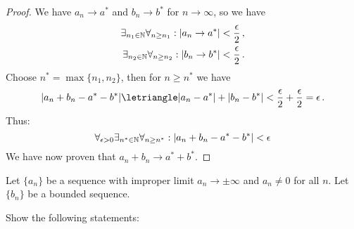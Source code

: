 \documentclass[week=3]{homework}
\begin{document}
\begin{questions}
\begin{parts}
\begin{proof}
	        	We have $a_n \to a^*$ and $b_n \to b^*$ for $n\to\infty$, so we have
		        \begin{align*}
		        	\exists_{n_1 \in\naturals}\forall_{n \geq n_1}: |a_n \to a^*| &< \frac{\epsilon}{2}\,, \\
		        	\exists_{n_2 \in\naturals}\forall_{n \geq n_2}: |b_n \to b^*| &< \frac{\epsilon}{2}\,.
	        	\end{align*}
	        	Choose $n^* = \max\{n_1,n_2\}$, then for $n \geq n^*$ we have
	        	\[
		        	|a_n + b_n - a^* - b^*| \letriangle |a_n - a^*| + |b_n - b^*| < \frac{\epsilon}{2} + \frac{\epsilon}{2} = \epsilon\,.
	        	\]
	        	Thus:
	        	\[
		        	\forall_{\epsilon > 0}\exists_{n^*\in\naturals}\forall_{n\geq n^*}: |a_n + b_n - a^* - b^*| < \epsilon
	        	\]
	        	We have now proven that $a_n + b_n \to a^* + b^*$.
	        \end{proof}
        \end{parts}
    
	    \question
	    Let $\{a_n\}$ be a sequence with improper limit $a_n \to \pm\infty$ and $a_n \neq 0$ for all $n$. Let $\{b_n\}$ be a bounded sequence.
	    
	    Show the following statements:
\end{questions}
\end{document}
